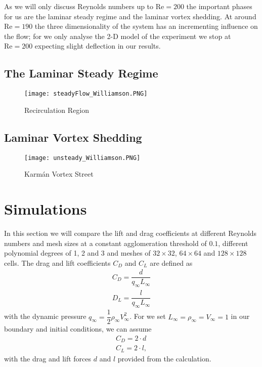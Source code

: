 	As we will only discuss Reynolds numbers up to $\text{Re} = 200$ the important phases for us are the laminar steady regime and the laminar vortex shedding. At around $\text{Re} = 190$ the three dimensionality of the system has an incrementing influence on the flow; for we only analyse the 2-D model of the experiment we stop at $\text{Re} = 200$ expecting slight deflection in our results.
	
	\subsection{The Laminar Steady Regime}
	
		\begin{figure}[htp]
			\centering
			\texttt{[image: steadyFlow\_Williamson.PNG]}
			\caption{Recirculation Region }
			\label{fig:steady}
		\end{figure}
	\subsection{Laminar Vortex Shedding}
	
		\begin{figure}[htp]
			\centering
			\texttt{[image: unsteady\_Williamson.PNG]}
			\caption{Karmán Vortex Street }
			\label{fig:unsteady}
		\end{figure}
		
\section{Simulations}
	In this section we will compare the lift and drag coefficients at different Reynolds numbers and mesh sizes at a constant agglomeration threshold of $0.1$, different polynomial degrees of 1, 2 and 3 and meshes of $32 \times 32$, $64 \times 64$ and $128 \times 128$ cells. The drag and lift coefficients $C_D$ and $C_L$ are defined as
	\begin{align}
		C_D = \dfrac{d}{q_\infty L_\infty} \\
		D_L = \dfrac{l}{q_\infty L_\infty}
	\end{align}
	with the dynamic pressure $q_\infty = \dfrac{1}{2} \rho_\infty V_\infty^2$. For we set $L_\infty = \rho_\infty = V_\infty = 1$ in our boundary and initial conditions, we can assume
	\begin{align}
		C_D = 2 \cdot d \\
		C_L = 2 \cdot l,
	\end{align}
	with the drag and lift forces $d$ and $l$ provided from the calculation.
	
